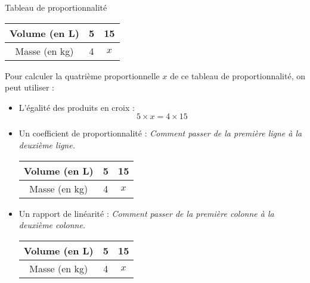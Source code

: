\documentclass[paper=a4, fontsize=9pt]{scrartcl} %
\begin{document}
\begin{Proposition}{Tableau de proportionnalité}

  \begin{multicols}{2}

    \begin{center}
      \begin{tabular}{| c || c | c |}
        \hline
        Volume (en L) & 5 & 15  \\
        \hline
        Masse (en kg) & 4 & $x$ \\ 
        \hline
      \end{tabular}
    \end{center}

    Pour calculer la quatrième proportionnelle $x$ de ce tableau de proportionnalité, on peut utiliser :

    \begin{itemize}
    \item L'égalité des produits en croix : 
      $$ 5 \times x = 4 \times 15 $$

    \item Un coefficient de proportionnalité : \textit{Comment passer de la première ligne à la deuxième ligne.}

      \begin{center}
        \begin{tabular}{| c || c | c |}
          \hline
          Volume (en L) & 5 & 15  \\
          \hline
          Masse (en kg) & 4 & $x$ \\ 
          \hline
        \end{tabular}
      \end{center}

    \item Un rapport de linéarité : \textit{Comment passer de la première colonne à la deuxième colonne.}

      \begin{center}
        \begin{tabular}{| c || c | c |}
          \hline
          Volume (en L) & 5 & 15  \\
          \hline
          Masse (en kg) & 4 & $x$ \\ 
          \hline
        \end{tabular}
      \end{center}
    \end{itemize}
  \end{multicols}
\end{Proposition}
\end{document}

